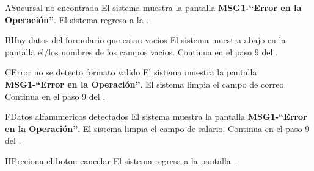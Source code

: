 
\begin{UCtrayectoriaA}{A}{Sucursal no encontrada}
	\UCpaso El sistema muestra la pantalla {\bf MSG1-``Error en la Operación''}.
	\UCpaso El sistema regresa a la .
\end{UCtrayectoriaA}

\begin{UCtrayectoriaA}{B}{Hay datos del formulario que estan vacios}
	\UCpaso El sistema muestra abajo en la pantalla el/los nombres de los campos vacios.
	\UCpaso Continua en el paso 9 del .
\end{UCtrayectoriaA}	

\begin{UCtrayectoriaA}{C}{Error no se detecto formato valido}
	\UCpaso  El sistema muestra la pantalla {\bf MSG1-``Error en la Operación''}.
	\UCpaso El sistema limpia el campo de correo.
	\UCpaso Continua en el paso 9 del .
\end{UCtrayectoriaA}
%
%
%


\begin{UCtrayectoriaA}{F}{Datos alfanumericos detectados}
	\UCpaso  El sistema muestra la pantalla {\bf MSG1-``Error en la Operación''}.
	\UCpaso El sistema limpia el campo de salario.
	\UCpaso Continua en el paso 9 del .
\end{UCtrayectoriaA}

\begin{UCtrayectoriaA}{H}{Preciona el boton cancelar}
	\UCpaso El sistema regresa a la pantalla  .
\end{UCtrayectoriaA}
